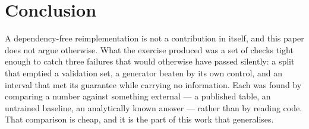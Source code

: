 \section{Conclusion}

A dependency-free reimplementation is not a contribution in itself, and this paper
does not argue otherwise. What the exercise produced was a set of checks tight enough
to catch three failures that would otherwise have passed silently: a split that
emptied a validation set, a generator beaten by its own control, and an interval that
met its guarantee while carrying no information. Each was found by comparing a number
against something external --- a published table, an untrained baseline, an
analytically known answer --- rather than by reading code. That comparison is cheap,
and it is the part of this work that generalises.
